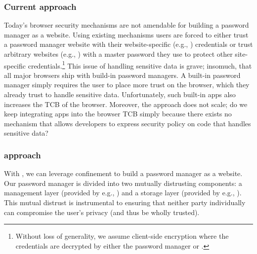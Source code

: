 \subsubsection{Current approach}
%
Today's browser security mechanisms are not amendable for building a
password manager as a website.
%
Using existing mechanisms users are forced to either trust a password
manager website with their website-specific (e.g., )
credentials or trust arbitrary websites (e.g., ) with a
master password they use to protect other site-specific
credentials.\footnote{
  Without loss of generality, we assume client-side encryption where
  the credentials are decrypted by either the password manager or
  .
}
%
This issue of handling sensitive data is grave; insomuch, that all
major browsers ship with build-in password managers.
%
A built-in password manager simply requires the user to place more
trust on the browser, which they already trust to handle sensitive
data.
%
Unfortunately, such built-in apps also increases the TCB of the
browser.
%
Moreover, the approach does not scale; do we keep integrating apps
into the browser TCB simply because there exists no mechanism that
allows developers to express security policy on code that handles
sensitive data?

\subsubsection{\sys{} approach}
%
With \sys{}, we can leverage confinement to build a password manager
as a website.
%
Our password manager is
divided into two mutually distrusting components: a
management layer (provided by e.g., ) and a storage
layer (provided by e.g., ).
%
This mutual distrust is instrumental to ensuring that neither party
individually can compromise the user's privacy (and thus be wholly
trusted).
%

